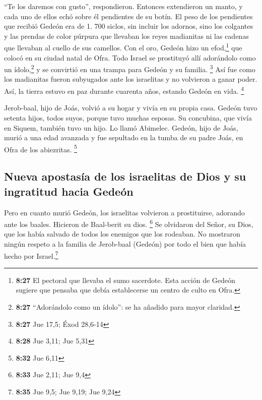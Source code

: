 ``Te los daremos con gusto'', respondieron. Entonces
extendieron un manto, y cada uno de ellos echó sobre él pendientes de su
botín.  El peso de los pendientes que recibió Gedeón era
de 1. 700 siclos, sin incluir los adornos, sino los colgantes y las
prendas de color púrpura que llevaban los reyes madianitas ni las
cadenas que llevaban al cuello de sus camellos.  Con el
oro, Gedeón hizo un efod,\footnote{\textbf{8:27} El pectoral que llevaba
  el sumo sacerdote. Esta acción de Gedeón sugiere que pensaba que debía
  establecerse un centro de culto en Ofra.} que colocó en su ciudad
natal de Ofra. Todo Israel se prostituyó allí adorándolo como un
ídolo,\footnote{\textbf{8:27} ``Adorándolo como un ídolo'': se ha
  añadido para mayor claridad.} y se convirtió en una trampa para Gedeón
y su familia. \footnote{\textbf{8:27} Jue 17,5; Éxod 28,6-14}
 Así fue como los madianitas fueron subyugados ante los
israelitas y no volvieron a ganar poder. Así, la tierra estuvo en paz
durante cuarenta años, estando Gedeón en vida. \footnote{\textbf{8:28}
  Jue 3,11; Jue 5,31}

 Jerob-baal, hijo de Joás, volvió a su hogar y vivía en
su propia casa.  Gedeón tuvo setenta hijos, todos suyos,
porque tuvo muchas esposas.  Su concubina, que vivía en
Siquem, también tuvo un hijo. Lo llamó Abimelec.  Gedeón,
hijo de Joás, murió a una edad avanzada y fue sepultado en la tumba de
su padre Joás, en Ofra de los abiezritas. \footnote{\textbf{8:32} Jue
  6,11}

\hypertarget{nueva-apostasuxeda-de-los-israelitas-de-dios-y-su-ingratitud-hacia-gedeuxf3n}{%
\subsection{Nueva apostasía de los israelitas de Dios y su ingratitud
hacia
Gedeón}\label{nueva-apostasuxeda-de-los-israelitas-de-dios-y-su-ingratitud-hacia-gedeuxf3n}}

 Pero en cuanto murió Gedeón, los israelitas volvieron a
prostituirse, adorando ante los baales. Hicieron de Baal-berit su dios.
\footnote{\textbf{8:33} Jue 2,11; Jue 9,4}  Se olvidaron
del Señor, su Dios, que los había salvado de todos los enemigos que los
rodeaban.  No mostraron ningún respeto a la familia de
Jerob-baal (Gedeón) por todo el bien que había hecho por
Israel.\footnote{\textbf{8:35} Jue 9,5; Jue 9,19; Jue 9,24}

